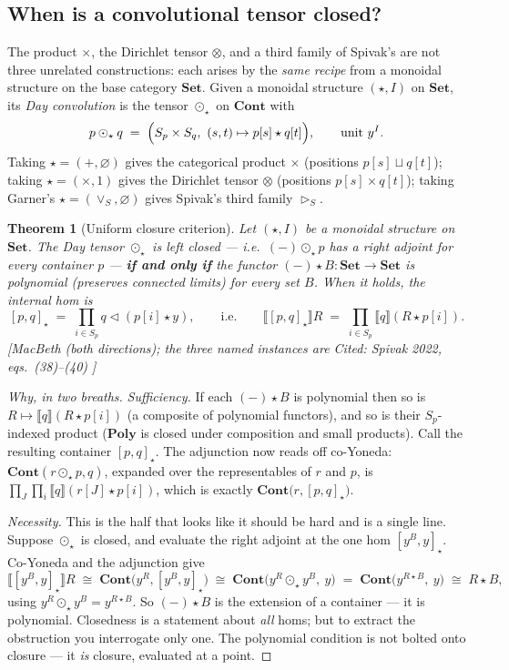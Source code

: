 \documentclass[11pt,a4paper]{book}
\newcommand{\Set}{\mathbf{Set}}
\newcommand{\Cont}{\mathbf{Cont}}
\newcommand{\Poly}{\mathbf{Poly}}
\newcommand{\cont}[2]{#1 \triangleleft #2}
\newcommand{\Ext}[1]{\llbracket #1 \rrbracket}
\theoremstyle{plain}
\newtheorem{Theorem}{Theorem}[chapter]
\theoremstyle{definition}
\theoremstyle{remark}
\newcommand{\prov}[1]{\hfill\textsf{\footnotesize[#1]}}
\begin{document}
\subsection{When is a convolutional tensor closed?}

The product $\times$, the Dirichlet tensor $\otimes$, and a third family of
Spivak's are not three unrelated constructions: each arises by the \emph{same
recipe} from a monoidal structure on the base category $\Set$. Given a monoidal
structure $(\star,I)$ on $\Set$, its \emph{Day convolution} is the tensor
$\odot_\star$ on $\Cont$ with
\[
   p\odot_\star q\;=\;\Bigl(S_p\times S_q,\ (s,t)\mapsto p[s]\star q[t]\Bigr),
   \qquad\text{unit }y^I .
\]
Taking $\star=(+,\varnothing)$ gives the categorical product $\times$ (positions
$p[s]\sqcup q[t]$); taking $\star=(\times,1)$ gives the Dirichlet tensor $\otimes$
(positions $p[s]\times q[t]$); taking Garner's $\star=(\vee_S,\varnothing)$ gives
Spivak's third family $\rhd_S$.

\begin{Theorem}[Uniform closure criterion]\label{thm:uniformclosed}
Let $(\star,I)$ be a monoidal structure on $\Set$. The Day tensor $\odot_\star$ is
\emph{left closed} --- i.e.\ $(-)\odot_\star p$ has a right adjoint for every
container $p$ --- \textbf{if and only if} the functor $(-)\star B\colon\Set\to\Set$
is polynomial (preserves connected limits) for every set $B$. When it holds, the
internal hom is
\[
   [p,q]_\star\;=\;\prod_{i\in S_p}\cont{q}{(p[i]\star y)},
   \qquad\text{i.e.}\qquad
   \Ext{[p,q]_\star}R\;=\;\prod_{i\in S_p}\Ext q{(R\star p[i])} .
\]
\prov{MacBeth (both directions); the three named instances are Cited: Spivak 2022,
eqs.~(38)--(40) \cite{SpivakRef}}
\end{Theorem}

\begin{proof}[Why, in two breaths]
\emph{Sufficiency.} If each $(-)\star B$ is polynomial then so is
$R\mapsto\Ext q{(R\star p[i])}$ (a composite of polynomial functors), and so is
their $S_p$-indexed product ($\Poly$ is closed under composition and small
products). Call the resulting container $[p,q]_\star$. The adjunction now reads off
co-Yoneda: $\Cont(r\odot_\star p,q)$, expanded over the representables of $r$ and
$p$, is $\prod_{J}\prod_{i}\Ext q{(r[J]\star p[i])}$, which is exactly
$\Cont\bigl(r,[p,q]_\star\bigr)$.

\emph{Necessity.} This is the half that looks like it should be hard and is a
single line. Suppose $\odot_\star$ is closed, and evaluate the right adjoint at the
one hom $[y^B,y]_\star$. Co-Yoneda and the adjunction give
\[
   \Ext{[y^B,y]_\star}R\;\cong\;\Cont\bigl(y^R,[y^B,y]_\star\bigr)
   \;\cong\;\Cont\bigl(y^R\odot_\star y^B,\ y\bigr)
   \;=\;\Cont\bigl(y^{R\star B},\ y\bigr)\;\cong\;R\star B ,
\]
using $y^R\odot_\star y^B=y^{R\star B}$. So $(-)\star B$ is the extension of a
container --- it is polynomial. Closedness is a statement about \emph{all} homs;
but to extract the obstruction you interrogate only one. The polynomial condition
is not bolted onto closure --- it \emph{is} closure, evaluated at a point.
\end{proof}
\end{document}
